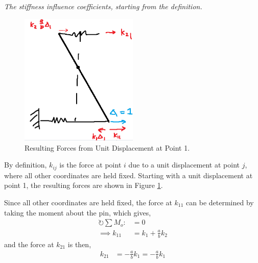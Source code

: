 \subsection{}
\textit{The stiffness influence coefficients, starting from the definition.}

\begin{figure}[H]
    \centering
    \includegraphics[width=0.5\textwidth]{Questions/Figures/Q1 k_i1.png}
    \caption{Resulting Forces from Unit Displacement at Point 1.}
    \label{fig:Q1 k_i1}
\end{figure}
By definition, $k_{ij}$ is the force at point $i$ due to a unit displacement at point $j$, where all other coordinates are held fixed. Starting with a unit displacement at point 1, the resulting forces are shown in Figure \ref{fig:Q1 k_i1}.

Since all other coordinates are held fixed, the force at $k_{11}$ can be determined by taking the moment about the pin, which gives,
\begin{align*}
    \circlearrowright \sum M_o :&=0 \\
    \implies k_{11} &= k_1 + \frac{a}{b} k_2
\end{align*}
and the force at $k_{21}$ is then,
\begin{align*}
    k_{21} &= -\frac{a}{b} k_{1} = -\frac{a}{b} k_1
\end{align*}

